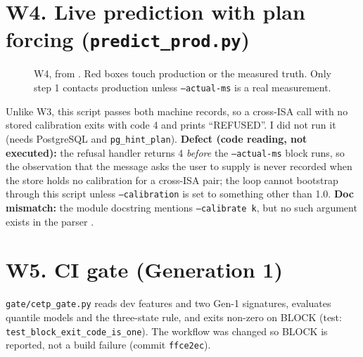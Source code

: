 \section{W4. Live prediction with plan forcing (\texttt{predict\_prod.py})}
\begin{figure}[ht]
\centering
{}
\caption{W4, from . Red boxes touch production or the measured truth. Only step 1 contacts production unless \texttt{--actual-ms} is a real measurement.}
\label{fig:w4}
\end{figure}
Unlike W3, this script passes both machine records, so a cross-ISA call with no stored calibration exits with code 4 and prints
``REFUSED''. I did not run it (needs PostgreSQL and \texttt{pg\_hint\_plan}). \textbf{Defect (code reading, not executed):} the refusal handler returns 4 \emph{before} the \texttt{--actual-ms} block runs, so the observation that the message asks the user to supply is never recorded when the store holds no calibration for a cross-ISA pair; the loop cannot bootstrap through this script unless \texttt{--calibration} is set to something other than 1.0. \textbf{Doc mismatch:} the module docstring mentions
\texttt{--calibrate k}, but no such argument exists in the parser \evCODE.

\section{W5. CI gate (Generation 1)}
\texttt{gate/cetp\_gate.py} reads dev features and two Gen-1 signatures, evaluates quantile models and the three-state rule, and exits non-zero on
BLOCK (test: \texttt{test\_block\_exit\_code\_is\_one}). The workflow was changed so BLOCK is reported, not a build failure (commit \texttt{ffce2ec}).

